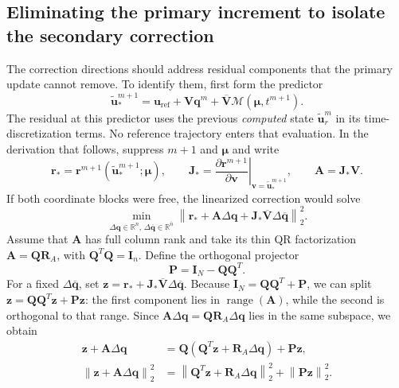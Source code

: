 \documentclass[11pt]{article}
\newcommand{\q}{\mathbf q}
\newcommand{\qbar}{\overline{\mathbf q}}
\newcommand{\uvec}{\mathbf u}
\newcommand{\utilde}{\widetilde{\mathbf u}}
\newcommand{\mub}{\bm\mu}
\newcommand{\norm}[1]{\left\lVert #1 \right\rVert}
\begin{document}
\subsection{Eliminating the primary increment to isolate the secondary correction}
The correction directions should address residual components that the
primary update cannot remove.  To identify them, first form the predictor
\begin{equation}
\utilde_*^{m+1}=\uvec_{\mathrm{ref}}+\mathbf V\q^m+
\overline{\mathbf V}\mathcal M(\mub,t^{m+1}).
\label{eq:adaptive-predictor}
\end{equation}
The residual at this predictor uses the previous \emph{computed} state
$\utilde_r^m$ in its time-discretization terms.  No reference trajectory enters
that evaluation.  In the derivation that follows, suppress $m+1$ and
$\mub$ and write
\begin{equation}
\mathbf r_* = \mathbf r^{m+1}(\utilde_*^{m+1};\mub),\qquad
\mathbf J_* = \left.\frac{\partial\mathbf r^{m+1}}{\partial\mathbf v}
\right|_{\mathbf v=\utilde_*^{m+1}},\qquad
\mathbf A=\mathbf J_*\mathbf V.
\label{eq:adaptive-linearization}
\end{equation}
If both coordinate blocks were free, the linearized correction would solve
\begin{equation}
\min_{\Delta\q\in\mathbb R^n,\,\Delta\qbar\in\mathbb R^{\bar n}}
\norm{\mathbf r_*+\mathbf A\Delta\q+
\mathbf J_*\overline{\mathbf V}\Delta\qbar}_2^2.
\label{eq:adaptive-full-linearized}
\end{equation}
Assume that $\mathbf A$ has full column rank and take its thin QR
factorization $\mathbf A=\mathbf Q\mathbf R_A$, with
$\mathbf Q^T\mathbf Q=\mathbf I_n$.  Define the orthogonal projector
\begin{equation}
\mathbf P=\mathbf I_N-\mathbf Q\mathbf Q^T.
\label{eq:adaptive-projector}
\end{equation}
For a fixed $\Delta\qbar$, set
$\mathbf z=\mathbf r_*+\mathbf J_*\overline{\mathbf V}\Delta\qbar$.
Because $\mathbf I_N=\mathbf Q\mathbf Q^T+\mathbf P$, we can split
$\mathbf z=\mathbf Q\mathbf Q^T\mathbf z+\mathbf P\mathbf z$:
the first component lies in $\operatorname{range}(\mathbf A)$, while
the second is orthogonal to that range.  Since
$\mathbf A\Delta\q=\mathbf Q\mathbf R_A\Delta\q$ lies in the same
subspace, we obtain
\begin{equation}
\begin{aligned}
\mathbf z+\mathbf A\Delta\q
&=\mathbf Q(\mathbf Q^T\mathbf z+\mathbf R_A\Delta\q)
+\mathbf P\mathbf z,\\
\norm{\mathbf z+\mathbf A\Delta\q}_2^2
&=\norm{\mathbf Q^T\mathbf z+\mathbf R_A\Delta\q}_2^2
+\norm{\mathbf P\mathbf z}_2^2.
\end{aligned}
\end{equation}
\end{document}
